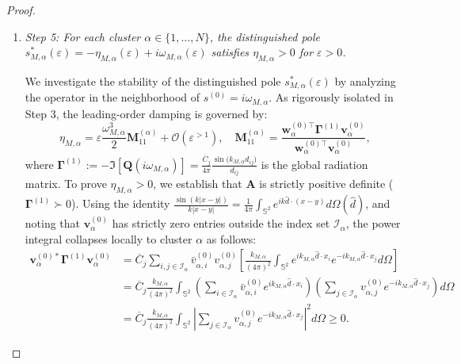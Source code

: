 \documentclass[11pt,a4paper]{article}
\numberwithin{equation}{section}
\begin{document}
\begin{proof}
\begin{enumerate}
\item \textit{Step 5: For each cluster $\alpha \in \{1, \dots, N\}$, the distinguished pole $s_{M, \alpha}^\ast(\varepsilon) = -\eta_{M, \alpha}(\varepsilon) + i\omega_{M, \alpha}(\varepsilon)$ satisfies $\eta_{M, \alpha} > 0$ for $\varepsilon > 0$.}

\medskip
\noindent
We investigate the stability of the distinguished pole $s_{M, \alpha}^\ast(\varepsilon)$ by analyzing the operator in the neighborhood of $s^{(0)} = i\omega_{M,\alpha}$. As rigorously isolated in Step 3, the leading-order damping is governed by:
\begin{equation}
    \eta_{M, \alpha} = \varepsilon \frac{\omega_{M,\alpha}^3}{2} \mathbf{M}_{11}^{(\alpha)} + \mathcal{O}(\varepsilon^{>1}), \quad \mathbf{M}_{11}^{(\alpha)} = \frac{\mathbf{w}_\alpha^{(0)\top} \mathbf{\Gamma}^{(1)} \mathbf{v}_\alpha^{(0)}}{\mathbf{w}_\alpha^{(0)\top} \mathbf{v}_\alpha^{(0)}},
\end{equation}
where $\mathbf{\Gamma}^{(1)} := -\Im[\mathbf{Q}(i\omega_{M,\alpha})] =\frac{\overline{C}_j}{4\pi}\frac{\sin\big(k_{M,\alpha}d_{ij}\big)}{d_{ij}} $ is the global radiation matrix. To prove $\eta_{M,\alpha} > 0$, we establish that $\mathbf{A}$ is strictly positive definite ($\mathbf{\Gamma}^{(1)} \succ 0$). Using the identity $\displaystyle\frac{\sin(k|x-y|)}{k|x-y|} = \frac{1}{4\pi} \int_{\mathbb{S}^2} e^{ik\hat{d}\cdot(x-y)} d\Omega(\hat{d})$, and noting that $\mathbf{v}_\alpha^{(0)}$ has strictly zero entries outside the index set $\mathcal{I}_\alpha$, the power integral collapses locally to cluster $\alpha$ as follows:
\begin{equation}
\begin{aligned}
\mathbf{v}_\alpha^{(0)*} \mathbf{\Gamma}^{(1)} \mathbf{v}_\alpha^{(0)} &= \overline{C}_j\sum_{i,j \in \mathcal{I}_\alpha} \bar{v}_{\alpha, i}^{(0)} v_{\alpha, j}^{(0)} \left[ \frac{k_{M,\alpha}}{(4\pi)^2} \int_{\mathbb{S}^2} e^{ik_{M,\alpha} \hat{d} \cdot x_i} e^{-ik_{M,\alpha} \hat{d} \cdot x_j} d\Omega \right] \\
&= \overline{C}_j\frac{k_{M,\alpha}}{(4\pi)^2} \int_{\mathbb{S}^2} \left( \sum_{i \in \mathcal{I}_\alpha} \bar{v}_{\alpha, i}^{(0)} e^{ik_{M,\alpha} \hat{d} \cdot x_i} \right) \left( \sum_{j \in \mathcal{I}_\alpha} v_{\alpha, j}^{(0)} e^{-ik_{M,\alpha} \hat{d} \cdot x_j} \right) d\Omega \\
&= \overline{C}_j\frac{k_{M,\alpha}}{(4\pi)^2} \int_{\mathbb{S}^2} \left| \sum_{j \in \mathcal{I}_\alpha} v_{\alpha, j}^{(0)} e^{-ik_{M,\alpha} \hat{d} \cdot x_j} \right|^2 d\Omega \ge 0.

\end{aligned}
\end{equation}
\end{enumerate}
\end{proof}
\end{document}
